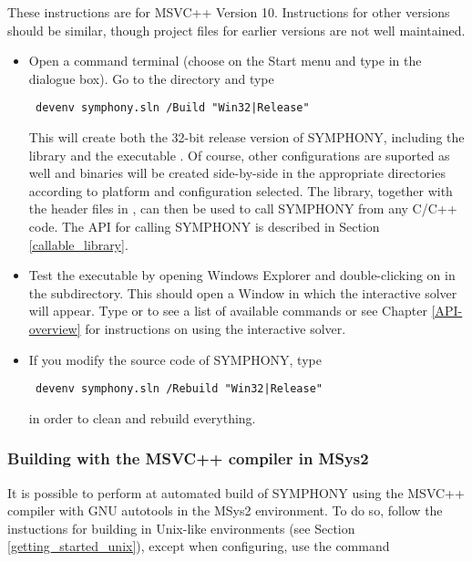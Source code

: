 These instructions are for MSVC++ Version 10. Instructions for other versions
should be similar, though project files for earlier versions are not well
maintained. 

\begin{itemize}
\item Open a command terminal (choose  on the Start menu and type
 in the dialogue box). Go to the 
directory and type 
{\color{brown}
\begin{verbatim}
 devenv symphony.sln /Build "Win32|Release"
\end{verbatim}
}This will create both the 32-bit release version of SYMPHONY, including the
library  and the executable . Of course,
other configurations are suported as well and binaries will be created
side-by-side in the appropriate directories according to platform and
configuration selected. The library, together with the header files in
, can then be used to call SYMPHONY from any
C/C++ code. The API for calling SYMPHONY is described in Section
\ref{callable_library}.

\item Test the executable by opening Windows Explorer and double-clicking
on  in the
 subdirectory. This should open a Window in
which the interactive solver will appear. Type  or  to see
a list of available commands or see Chapter
\ref{API-overview} for instructions on using the interactive solver.

\item If you modify the source code of SYMPHONY, type 
{\color{brown}
\begin{verbatim}
 devenv symphony.sln /Rebuild "Win32|Release"
\end{verbatim}
}
in order to clean and rebuild everything.
\end{itemize} 

\subsubsection{Building with the MSVC++ compiler in MSys2}

It is possible to perform at automated build of SYMPHONY using the MSVC++
compiler  with GNU autotools in the MSys2 environment. To do so,
follow the instuctions for building in Unix-like environments (see Section
\ref{getting_started_unix}), except when configuring, use the command

